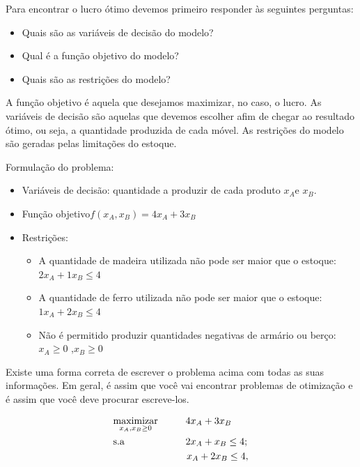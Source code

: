 Para encontrar o lucro ótimo devemos primeiro responder às seguintes perguntas:
\begin{itemize}
\item Quais são as variáveis de decisão do modelo?
\item Qual é a função objetivo do modelo?
\item Quais são as restrições do modelo?
\end{itemize}

A função objetivo é aquela que desejamos maximizar, no caso, o lucro. As variáveis de decisão são aquelas que devemos escolher afim de chegar ao resultado ótimo, ou seja, a quantidade produzida de cada móvel. As restrições do modelo são geradas pelas limitações do estoque. 

Formulação do problema:
\begin{itemize}
\item Variáveis de decisão: quantidade a produzir de cada produto $x_{A}$e
$x_{B}$.
\item Função objetivo$f(x_{A},x_{B})=4x_{A}+3x_{B}$
\item Restrições:



\begin{itemize}
\item A quantidade de madeira utilizada não pode ser maior que o estoque:
$2x_{A}+1x_{B}\leq4$
\item A quantidade de ferro utilizada não pode ser maior que o estoque:
$1x_{A}+2x_{B}\leq4$
\item Não é permitido produzir quantidades negativas de armário ou berço: $x_{A}\geq0$ ,$x_{B}\geq0$\end{itemize}
\end{itemize}

Existe uma forma correta de escrever o problema acima com todas as suas informações. Em geral, é assim que você vai encontrar problemas de otimização e é assim que você deve procurar escreve-los. 

\begin{align}
    & \underset{x_A, x_B\geq0}{\text{maximizar}} \hspace{1cm} 4x_A+3x_B \label{eq1} \\
    & \text{s.a}  \hspace{2.2cm} 2x_A+x_B \leq 4; \label{eq2} \\
    &             \hspace{2.65cm} x_A+2x_B\leq 4, \label{eq3}
\end{align}

